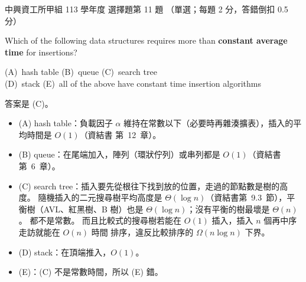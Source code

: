 \begin{pastexam}[label={px:nchu-113-dsa-11}]{中興資工所甲組 113 學年度 選擇題第 11 題}
（單選；每題 2 分，答錯倒扣 0.5 分）

Which of the following data structures requires more than \textbf{constant average time} for insertions?

(A)~hash table \qquad (B)~queue \qquad (C)~search tree\\
(D)~stack \qquad (E)~all of the above have constant time insertion algorithms
\end{pastexam}

\begin{pastsoln}
答案是 (C)。
\begin{itemize}
\item (A) hash table：負載因子 $\alpha$ 維持在常數以下（必要時再雜湊擴表），插入的平均時間是 $O(1)$（資結書
第~12~章）。
\item (B) queue：在尾端加入，陣列（環狀佇列）或串列都是 $O(1)$（資結書第~6~章）。
\item (C) search tree：插入要先從根往下找到放的位置，走過的節點數是樹的高度。 隨機插入的二元搜尋樹平均高度是
$\Theta(\log n)$（資結書第~9.3~節），平衡樹（AVL、紅黑樹、B 樹）也是 $\Theta(\log n)$；沒有平衡的樹最壞是
$\Theta(n)$。 都不是常數。 而且比較式的搜尋樹若能在 $O(1)$ 插入，插入 $n$ 個再中序走訪就能在 $O(n)$ 時間
排序，違反比較排序的 $\Omega(n \log n)$ 下界。
\item (D) stack：在頂端推入，$O(1)$。
\item (E)：(C) 不是常數時間，所以 (E) 錯。
\end{itemize}
\end{pastsoln}

